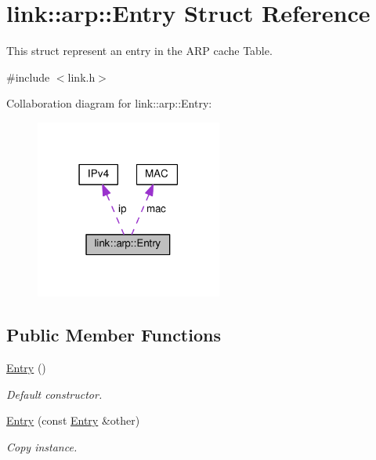 \hypertarget{structlink_1_1arp_1_1Entry}{}\section{link\+:\+:arp\+:\+:Entry Struct Reference}
\label{structlink_1_1arp_1_1Entry}


This struct represent an entry in the A\+RP cache Table.  




{\ttfamily \#include $<$link.\+h$>$}



Collaboration diagram for link\+:\+:arp\+:\+:Entry\+:\nopagebreak
\begin{figure}[H]
\begin{center}
\leavevmode
\includegraphics[width=174pt]{structlink_1_1arp_1_1Entry__coll__graph}
\end{center}
\end{figure}
\subsection*{Public Member Functions}
\begin{DoxyCompactItemize}
\item 
\hyperlink{structlink_1_1arp_1_1Entry_af14702ffc3a1b10e45a148220af6b5d4}{Entry} ()
\begin{DoxyCompactList}\small\item\em Default constructor. \end{DoxyCompactList}\item 
\hyperlink{structlink_1_1arp_1_1Entry_ab2adef8c42d08549d72c9fba0839da5c}{Entry} (const \hyperlink{structlink_1_1arp_1_1Entry}{Entry} \&other)
\begin{DoxyCompactList}\small\item\em Copy instance. \end{DoxyCompactList}\end{DoxyCompactItemize}
